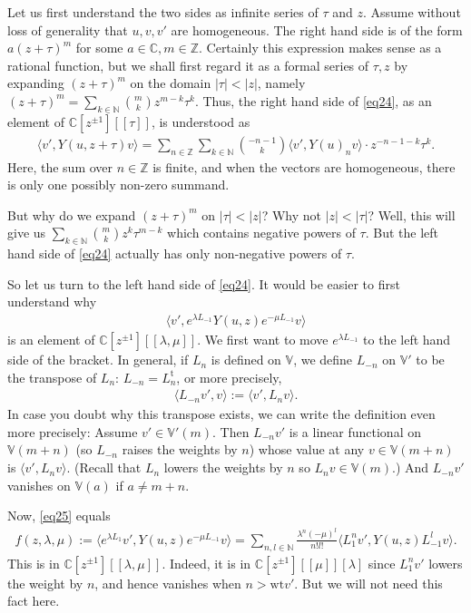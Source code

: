 \documentclass[12pt,a4paper,notitlepage]{article}
\theoremstyle{definition}
\theoremstyle{plain}
\newcommand{\tr}{\mathrm{t}} %
\newcommand{\bk}[1]{\langle {#1}\rangle}
\newcommand{\bigbk}[1]{\big\langle {#1}\big\rangle}
\newcommand{\Vbb}{\mathbb V}
\newcommand{\Cbb}{\mathbb C}
\newcommand{\Nbb}{\mathbb N}
\newcommand{\Zbb}{\mathbb Z}
\newcommand{\wt}{\mathrm{wt}}
\numberwithin{equation}{section}
\begin{document}
Let us first understand the two sides as infinite series of $\tau$ and $z$. Assume without loss of generality that $u,v,v'$ are homogeneous. The right hand side is of the form $a(z+\tau)^m$ for some $a\in\Cbb,m\in\Zbb$. Certainly this expression makes sense as a rational function, but we shall first regard it as a formal series of $\tau,z$ by expanding $(z+\tau)^m$ on the domain $|\tau|<|z|$, namely $(z+\tau)^m=\sum_{k\in\Nbb}{m\choose k} z^{m-k}\tau^k$. Thus, the right hand side of \eqref{eq24}, as an element of $\Cbb[z^{\pm 1}][[\tau]]$, is understood as
\begin{align*}
\bigbk{v',Y(u,z+\tau)v}=\sum_{n\in\Zbb}\sum_{k\in\Nbb}{-n-1\choose k}	\bigbk{v',Y(u)_nv}\cdot z^{-n-1-k}\tau^k.
\end{align*}
Here, the sum over $n\in\Zbb$ is finite, and when the vectors are homogeneous, there is only one possibly non-zero summand.

But why do we expand $(z+\tau)^m$ on $|\tau|<|z|$? Why not $|z|<|\tau|$? Well, this will give us $\sum_{k\in\Nbb}{m\choose k}z^k\tau^{m-k}$ which contains negative powers of $\tau$. But the left hand side of \eqref{eq24} actually has only non-negative powers of $\tau$.

So let us turn to the left hand side of \eqref{eq24}. It would be easier to first understand why
\begin{align}
\bigbk{v',e^{\lambda L_{-1}}Y(u,z)e^{-\mu L_{-1}}v}	\label{eq25}
\end{align}
is an element of $\Cbb[z^{\pm1}][[\lambda,\mu]]$. We first want to move $e^{\lambda L_{-1}}$ to the left hand side of the bracket. In general, if $L_n$ is defined on $\Vbb$, we define $L_{-n}$ on $\Vbb'$ to be the transpose of $L_n$: $L_{-n}=L_n^\tr$, or more precisely,
\begin{align}
\bk{L_{-n}v',v}:=\bk{v',L_nv}.	
\end{align}
In case you doubt why this transpose exists, we can write the definition even more precisely: Assume $v'\in\Vbb'(m)$. Then $L_{-n}v'$ is a linear functional on $\Vbb(m+n)$ (so $L_{-n}$ raises the weights by $n$) whose value at any $v\in\Vbb(m+n)$ is $\bk{v',L_nv}$. (Recall that $L_n$ lowers the weights by $n$ so $L_nv\in\Vbb(m)$.) And $L_{-n}v'$ vanishes on $\Vbb(a)$ if $a\neq m+n$.



Now,  \eqref{eq25} equals
\begin{align}
f(z,\lambda,\mu):=\bigbk{e^{\lambda L_1}v',Y(u,z)e^{-\mu L_{-1}}v}=\sum_{n,l\in\Nbb}\frac{\lambda^n(-\mu)^l}{n!l!}\bigbk{L_1^nv',Y(u,z)L_{-1}^lv}.	
\end{align}
This is in $\Cbb[z^{\pm1}][[\lambda,\mu]]$. Indeed, it is in $\Cbb[z^{\pm1}][[\mu]][\lambda]$ since $L_1^nv'$ lowers the weight by $n$, and hence vanishes when $n>\wt v'$. But we will not need this fact here. 
\end{document}
